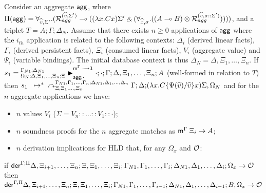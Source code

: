 \begin{theorem}\label{thm:aggregates}

Consider an aggregate $\mathsf{agg}$, where $\Pi(\mathsf{agg}) = \forall_{\widehat{v}, \Sigma'}.
  (\mathcal{R}_{agg}^{(\widehat{v}, \Sigma')} \multimap ((\lambda x. C x)\Sigma' \mathbin{\binampersand} (\forall_{\widehat{x}, \sigma}.
                                               ((A \multimap B) \otimes
                                                \mathcal{R}_{agg}^{(\widehat{v}, \sigma
                                                ::\Sigma')}))))$,
and a triplet $T = A; \Gamma; \Delta_{N}$.
Assume that there exists $n \geq 0$ applications of $\mathsf{agg}$
where the $i_{th}$ application is related to the following contexts: 
  $\Delta_i$ (derived linear facts), $\Gamma_i$ (derived persistent facts),
  $\Xi_i$ (consumed linear facts),
  $V_i$ (aggregate value) and
  $\Psi_i$ (variable bindings).
The initial database context is thus $\Delta_N = \Delta, \Xi_1, \dotsc, \Xi_n$.
If $s_1 = {{}^{\Gamma_{N1}; \Delta_{N1}}_{\Omega_N ; \Delta, \Xi_1, \dotsc, \Xi_n ; \Xi}\blacktriangleright}_{\mathsf{agg} ; \cdot}^{\mathsf{m}^\Gamma \; \cdot \rightarrow \mathbf{1}} \; \cdot;
  \cdot; \Gamma; \Delta, \Xi_1, \dotsc, \Xi_n; A$
  (well-formed in relation to $T$) then $\transs{s_1}{\derstatex{\Gamma}{\Delta}{\Xi, \Xi_1, \dotsc, \Xi_n}{\Gamma_{N1},                                              \Gamma_1, \dotsc, \Gamma_n}{\Delta_{N1}, \Delta_1, \dotsc,
        \Delta_n}{$\\$ (\lambda x.  C\{\Psi(\widehat{v})/\widehat{v}\} x) \Sigma,
           \Omega_N}}$ and for the $n$ aggregate applications we have:
\begin{itemize}[leftmargin=*]
     \item $n$ values $V_i$ ($\Sigma = V_n :: \dots :: V_1 :: \cdot$);
     \item $n$ soundness proofs for the $n$ aggregate matches as $\mathsf{m}^{\Gamma} \; \Xi_i \rightarrow A$;

     \item $n$ derivation implications for HLD that, for any $\Omega_x$ and
        $\mathcal{O}$:
  \end{itemize}
  \vspace{-4mm}
        {\small if $\mathsf{der}^{\Gamma ; \Pi} \Delta, \Xi_{i+1}, \dotsc, \Xi_{n} ; \Xi, \Xi_1,
        \dotsc, \Xi_i; \Gamma_{N1}, \Gamma_1, \dotsc, \Gamma_i; \Delta_{N1},
           \Delta_1, \dotsc, \Delta_i; \Omega_x \rightarrow \mathcal{O}$ then \\
              $\mathsf{der}^{\Gamma ; \Pi} \Delta, \Xi_{i+1}, \dotsc, \Xi_{n} ; \Xi, \Xi_1,
              \dotsc, \Xi_i; \Gamma_{N1}, \Gamma_1, \dotsc, \Gamma_{i-1}; \Delta_{N1},
              \Delta_1, \dotsc, \Delta_{i-1}; B, \Omega_x \rightarrow \mathcal{O}$}

\end{theorem}

